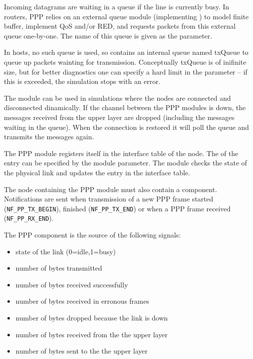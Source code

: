 Incoming datagrams are waiting in a queue if the line is currently busy.
In routers, PPP relies on an external queue module (implementing 
) to model finite buffer, implement QoS and/or RED,
and requests packets from this external queue one-by-one. The name
of this queue is given as the  parameter.

In hosts, no such queue is used, so  contains an internal
queue named txQueue to queue up packets wainting for transmission.
Conceptually txQueue is of inifinite size, but for better diagnostics
one can specify a hard limit in the  parameter -- if
this is exceeded, the simulation stops with an error.

The module can be used in simulations where the nodes are connected and
disconnected dinamically. If the channel between the PPP modules is down,
the messages received from the upper layer are dropped (including the messages
waiting in the queue). When the connection is restored it will
poll the queue and transmits the messages again. 

The PPP module registers itself in the interface table of the node.
The  of the entry can be specified by the
 module parameter. The module checks the state of the physical link
and updates the entry in the interface table.

The node containing the PPP module must also contain a
 component. Notifications are sent when
transmission of a new PPP frame started (\verb!NF_PP_TX_BEGIN!), finished
(\verb!NF_PP_TX_END!) or when a PPP frame received (\verb!NF_PP_RX_END!).

The PPP component is the source of the following signals:
\begin{itemize}
\item {} state of the link (0=idle,1=busy)
\item {} number of bytes transmitted
\item {} number of bytes received successfully
\item {} number of bytes received in erronous frames
\item {} number of bytes dropped because the link is down
\item {} number of bytes received from the the upper layer
\item {} number of bytes sent to the the upper layer
\end{itemize}

